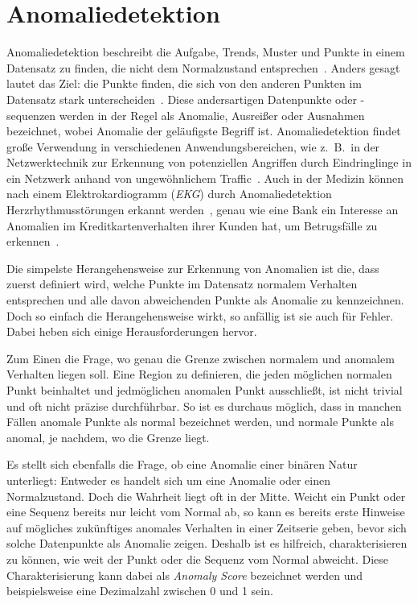  \chapter{Anomaliedetektion}\label{ch:anomaliedetektion}
Anomaliedetektion beschreibt die Aufgabe, Trends, Muster und Punkte in einem Datensatz zu finden, die nicht dem Normalzustand
entsprechen~\cite{Chandola2009}. Anders gesagt lautet das Ziel: die Punkte finden, die sich von den anderen Punkten im Datensatz
stark unterscheiden~\cite[Kap.~10]{Tan2014}. Diese andersartigen Datenpunkte oder -sequenzen werden in der Regel als Anomalie,
Ausreißer oder Ausnahmen bezeichnet, wobei Anomalie der geläufigste Begriff ist. Anomaliedetektion findet große Verwendung in
verschiedenen Anwendungsbereichen, wie z.~B.~in der Netzwerktechnik zur Erkennung von potenziellen Angriffen durch Eindringlinge
in ein Netzwerk anhand von ungewöhnlichem Traffic~\Cite{Bernacki2015}. Auch in der Medizin können nach einem Elektrokardiogramm
(\textit{EKG}) durch Anomaliedetektion Herzrhythmusstörungen erkannt werden~\cite{Chuah2007}, genau wie eine Bank ein Interesse
an Anomalien im Kreditkartenverhalten ihrer Kunden hat, um Betrugsfälle zu erkennen~\cite{Jiang2023, CeronmaniSharmila2019}.

Die simpelste Herangehensweise zur Erkennung von Anomalien ist die, dass zuerst definiert wird, welche Punkte im Datensatz normalem
Verhalten entsprechen und alle davon abweichenden Punkte als Anomalie zu kennzeichnen. Doch so einfach die Herangehensweise wirkt,
so anfällig ist sie auch für Fehler. Dabei heben sich einige Herausforderungen hervor.

Zum Einen die Frage, wo genau die Grenze zwischen normalem und anomalem Verhalten liegen soll. Eine Region zu definieren, die jeden 
möglichen normalen Punkt beinhaltet und jedmöglichen anomalen Punkt ausschließt, ist nicht trivial und oft nicht präzise durchführbar.
So ist es durchaus möglich, dass in manchen Fällen anomale Punkte als normal bezeichnet werden, und normale Punkte als anomal, je
nachdem, wo die Grenze liegt.

Es stellt sich ebenfalls die Frage, ob eine Anomalie einer binären Natur unterliegt: Entweder es handelt sich um eine Anomalie oder
einen Normalzustand. Doch die Wahrheit liegt oft in der Mitte. Weicht ein Punkt oder eine Sequenz bereits nur leicht vom Normal ab,
so kann es bereits erste Hinweise auf mögliches zukünftiges anomales Verhalten in einer Zeitserie geben, bevor sich solche Datenpunkte
als Anomalie zeigen. Deshalb ist es hilfreich, charakterisieren zu können, wie weit der Punkt oder die Sequenz
vom Normal abweicht. Diese Charakterisierung kann dabei als \textit{Anomaly Score} bezeichnet werden und beispielsweise eine Dezimalzahl
zwischen 0 und 1 sein.

